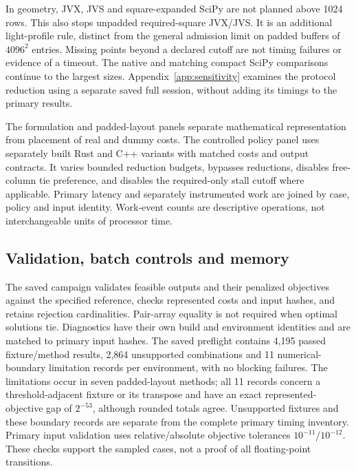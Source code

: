 \documentclass[11pt,a4paper]{article}
\begin{document}
In geometry, JVX, JVS and square-expanded SciPy are not planned above 1024 rows. This also stops unpadded required-square JVX/JVS. It is an additional light-profile rule, distinct from the general admission limit on padded buffers of $4096^2$ entries. Missing points beyond a declared cutoff are not timing failures or evidence of a timeout. The native and matching compact SciPy comparisons continue to the largest sizes. Appendix~\ref{app:sensitivity} examines the protocol reduction using a separate saved full session, without adding its timings to the primary results.

The formulation and padded-layout panels separate mathematical representation from placement of real and dummy costs. The controlled policy panel uses separately built Rust and C++ variants with matched costs and output contracts. It varies bounded reduction budgets, bypasses reductions, disables free-column tie preference, and disables the required-only stall cutoff where applicable. Primary latency and separately instrumented work are joined by case, policy and input identity. Work-event counts are descriptive operations, not interchangeable units of processor time.

\begin{table}[!htbp]
\centering
\caption{Methods, representations and controlled LSAPE arms. Here $r\le c$ denotes oriented JV dimensions; LSAPE retains original $n,m$. Definitions are not measured memory or speed claims.}
\label{tab:methods}
\begingroup\small
\setlength{\tabcolsep}{3pt}
\renewcommand{\arraystretch}{1.12}

\endgroup
\end{table}

\subsection{Validation, batch controls and memory}

The saved campaign validates feasible outputs and their penalized objectives against the specified reference, checks represented costs and input hashes, and retains rejection cardinalities. Pair-array equality is not required when optimal solutions tie. Diagnostics have their own build and environment identities and are matched to primary input hashes. The saved preflight contains 4,195 passed fixture/method results, 2,864 unsupported combinations and 11 numerical-boundary limitation records per environment, with no blocking failures. The limitations occur in seven padded-layout methods; all 11 records concern a threshold-adjacent fixture or its transpose and have an exact represented-objective gap of $2^{-53}$, although rounded totals agree. Unsupported fixtures and these boundary records are separate from the complete primary timing inventory. Primary input validation uses relative/absolute objective tolerances $10^{-11}$/$10^{-12}$. These checks support the sampled cases, not a proof of all floating-point transitions.
\end{document}
